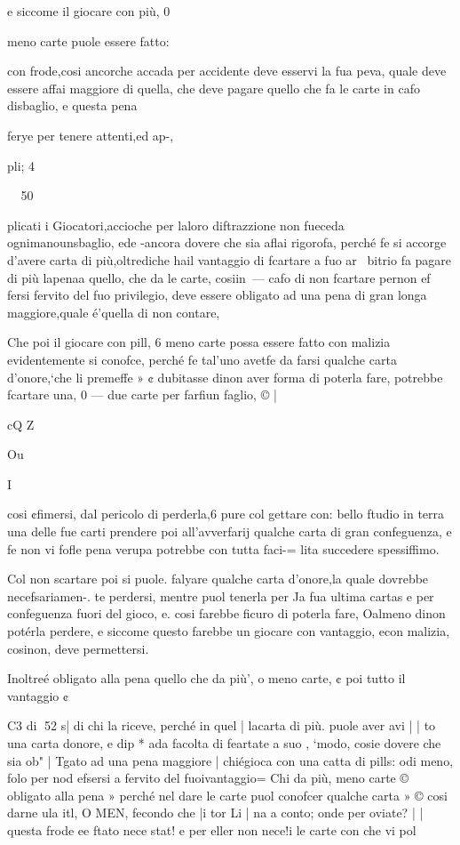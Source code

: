 \documentclass[12pt,a6paper]{article}
\begin{document}
e siccome il giocare con più, 0

meno carte puole essere fatto:

con frode,cosi ancorche accada
per accidente deve esservi la
fua peva, quale deve essere affai maggiore di quella, che deve pagare quello che fa le carte
in cafo disbaglio, e questa pena

ferye per tenere attenti,ed ap-,

pli; 4

~
50

plicati i Giocatori,accioche per
laloro diftrazzione non fueceda ognimanounsbaglio, ede
-ancora dovere che sia aflai rigorofa, perché fe si accorge d’avere carta di più,oltrediche hail
vantaggio di fcartare a fuo ar~
bitrio fa pagare di più lapenaa
quello, che da le carte, cosiin~—
cafo di non fcartare pernon ef
fersi fervito del fuo privilegio,
deve essere obligato ad una pena di gran longa maggiore,quale é’quella di non contare,

Che poi il giocare con pill, 6
meno carte possa essere fatto
con malizia evidentemente si
conofce, perché fe tal’uno avetfe da farsi qualche carta d’onore,‘che li premeffe » ¢ dubitasse
dinon aver forma di poterla
fare, potrebbe fcartare una, 0 —
due carte per farfiun faglio, © |

cQ
Z
 

Ou

I

cosi ¢fimersi, dal pericolo di
perderla,6 pure col gettare con:
bello ftudio in terra una delle
fue carti prendere poi all’avverfarij qualche carta di gran confeguenza, e fe non vi fofle pena
verupa potrebbe con tutta faci-=
lita succedere spessiffimo. 

Col non scartare poi si puole.
falyare qualche carta d’onore,la
quale dovrebbe necefsariamen-.
te perdersi, mentre puol tenerla per Ja fua ultima cartas e per
confeguenza fuori del gioco, e.
cosi farebbe ficuro di poterla fare, Oalmeno dinon potérla
perdere, e siccome questo farebbe un giocare con vantaggio, econ malizia, cosinon,
deve permettersi.

Inoltreé obligato alla pena
quello che da più’, o meno carte, ¢ poi tutto il vantaggio ¢

C3 di
52
s| di chi la riceve, perché in quel
| lacarta di più. puole aver avi
| | to una carta donore, e dip *
ada facolta di feartate a suo
, ‘modo, cosie dovere che sia ob"
| Tgato ad una pena maggiore
| chiégioca con una catta di pills:
odi meno, folo per nod efsersi
a fervito del fuoivantaggio=
Chi da più, meno carte ©
obligato alla pena » perché nel
dare le carte puol conofcer
qualche carta » © cosi darne ula
itl, O MEN, fecondo che |i tor
Li | na a conto; onde per oviate?
| | questa frode ee ftato nece stat!
e per eller
non nece!i le carte con
che vi pol
\end{document}

